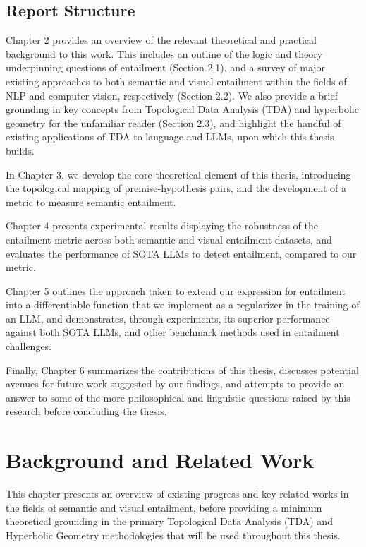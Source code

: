 \documentclass[12pt,twoside]{report}
\begin{document}
\section{Report Structure}
Chapter 2 provides an overview of the relevant theoretical and practical background to this work. This includes an outline of the logic and theory underpinning questions of entailment (Section 2.1), and a survey of major existing approaches to both semantic and visual entailment within the fields of NLP and computer vision, respectively (Section 2.2). We also provide a brief grounding in key concepts from Topological Data Analysis (TDA) and hyperbolic geometry for the unfamiliar reader (Section 2.3), and highlight the handful of existing  applications of TDA to language and LLMs, upon which this thesis builds. \par   \quad In Chapter 3, we develop the core theoretical element of this thesis, introducing the topological mapping of premise-hypothesis pairs, and the development of a metric to measure semantic entailment. \par 
\quad Chapter 4 presents experimental results displaying the robustness of the entailment metric across both semantic and visual entailment datasets, and evaluates the performance of SOTA LLMs to detect entailment, compared to our metric. \par
\quad Chapter 5 outlines the approach taken to extend our expression for entailment into a differentiable function that we implement as a regularizer in the training of an LLM, and demonstrates, through experiments, its superior performance against both SOTA LLMs, and other benchmark methods used in entailment challenges. \par
\quad Finally, Chapter 6 summarizes the contributions of this thesis, discusses potential avenues for future work suggested by our findings, and attempts to provide an answer to some of the more philosophical and linguistic questions raised by this research before concluding the thesis.




\chapter{Background and Related Work}
This chapter presents an overview of existing progress and key related works in the fields of semantic and visual entailment, before providing a minimum theoretical grounding in the primary Topological Data Analysis (TDA) and Hyperbolic Geometry methodologies that will be used throughout this thesis. \newline \par
\end{document}
